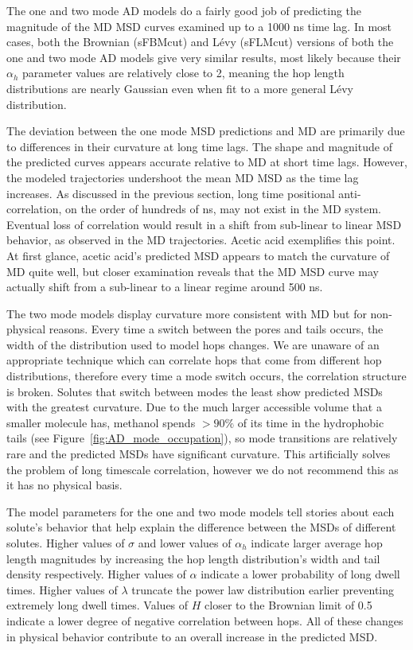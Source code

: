 \documentclass[journal=jctcce,manuscript=article]{achemso}
\begin{document}
  The one and two mode AD models do a fairly good job of predicting the
  magnitude of the MD MSD curves examined up to a 1000 ns time lag. In most
  cases, both the Brownian (sFBMcut) and L\'evy (sFLMcut) versions of both the
  one and two mode AD models give very similar results, most likely because
  their $\alpha_h$ parameter values are relatively close to 2, meaning the hop
  length distributions are nearly Gaussian even when fit to a more general
  L\'evy distribution. 
  
  The deviation between the one mode MSD predictions and MD are primarily due
  to differences in their curvature at long time lags. The shape and magnitude
  of the predicted curves appears accurate relative to MD at short time lags.
  However, the modeled trajectories undershoot the mean MD MSD as the time lag
  increases. As discussed in the previous section, long time positional
  anti-correlation, on the order of hundreds of ns, may not exist in the MD
  system. Eventual loss of correlation would result in a shift from sub-linear
  to linear MSD behavior, as observed in the MD trajectories. Acetic acid
  exemplifies this point. At first glance, acetic acid's predicted MSD appears
  to match the curvature of MD quite well, but closer examination reveals that
  the MD MSD curve may actually shift from a sub-linear to a linear regime around
  500 ns.
  
  The two mode models display curvature more consistent with MD but for
  non-physical reasons. Every time a switch between the pores and tails occurs,
  the width of the distribution used to model hops changes. We are unaware of
  an appropriate technique which can correlate hops that come from different
  hop distributions, therefore every time a mode switch occurs, the correlation
  structure is broken. Solutes that switch between modes the least show
  predicted MSDs with the greatest curvature. Due to the much larger
  accessible volume that a smaller molecule has, methanol spends $>90\%$ of its
  time in the hydrophobic tails (see Figure~\ref{fig:AD_mode_occupation}), so
  mode transitions are relatively rare and the predicted MSDs have significant
  curvature. This artificially solves the problem of long timescale
  correlation, however we do not recommend this as it has no physical basis.
  

  The model parameters for the one and two mode models tell stories about each
  solute's behavior that help explain the difference between the MSDs of
  different solutes. Higher values of $\sigma$ and lower values of $\alpha_h$
  indicate larger average hop length magnitudes by increasing the hop length
  distribution's width and tail density respectively. Higher values of $\alpha$
  indicate a lower probability of long dwell times. Higher values of $\lambda$
  truncate the power law distribution earlier preventing extremely long dwell
  times. Values of $H$ closer to the Brownian limit of 0.5 indicate a lower
  degree of negative correlation between hops. All of these changes in physical
  behavior contribute to an overall increase in the predicted MSD.
\end{document}
